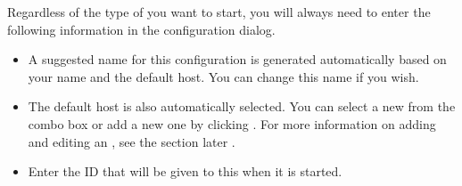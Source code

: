 Regardless of the type of \gdaut{} you want to start, you will always need to enter the following information in the \gdaut{} configuration dialog. 

\begin{itemize}
\item  A suggested name for this \gdaut{} configuration is generated automatically based on your \gdaut{} name and the default \gdagent{} host. You can change this name if you wish. 
\item The default \gdagent host is also automatically selected. You can select a new \gdagent{} from the combo box or add a new one by clicking . For more information on adding and editing an \gdagent{}, see the section later .
\item Enter the \gdaut{} ID that will be given to this \gdaut{} when it is started.  
\end{itemize}



